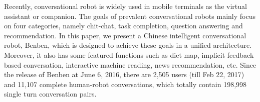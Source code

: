 Recently, conversational robot is widely used in mobile terminals as the virtual assistant or companion. The goals of prevalent conversational robots mainly focus on four categories, namely chit-chat, task completion, question answering and recommendation. In this paper, we present a Chinese intelligent conversational robot, Benben, which is designed to achieve these goals in a unified architecture. Moreover, it also has some featured functions such as diet map, implicit feedback based conversation, interactive machine reading, news recommendation, etc. Since the release of Benben at June 6, 2016, there are 2,505 users (till Feb 22, 2017) and 11,107 complete human-robot conversations, which totally contain 198,998 single turn conversation pairs.
